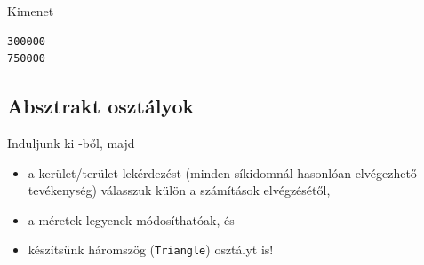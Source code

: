 \begin{frame}[fragile]
    \begin{exampleblock}{}
        \footnotesize
        
        
    \end{exampleblock}
    \begin{block}{Kimenet}
        \footnotesize
        \vspace{-.3cm}
        \begin{verbatim}
300000
750000
        \end{verbatim}
        \vspace{-.6cm}
    \end{block}
\end{frame}

\subsection{Absztrakt osztályok}

\begin{frame}
    Induljunk ki -ből, majd 
    \begin{itemize}
        \item a kerület/terület lekérdezést (minden síkidomnál hasonlóan elvégezhető tevékenység) válasszuk külön a számítások elvégzésétől,
        \item a méretek legyenek módosíthatóak, és
        \item készítsünk háromszög (\texttt{Triangle}) osztályt is!
    \end{itemize}
\end{frame}    
     
\begin{frame}
    \begin{columns}[T]
            \begin{exampleblock}{}
                \scriptsize
                
            \end{exampleblock}
            \begin{exampleblock}{}
                \scriptsize
                
            \end{exampleblock}
    \end{columns}
\end{frame}

